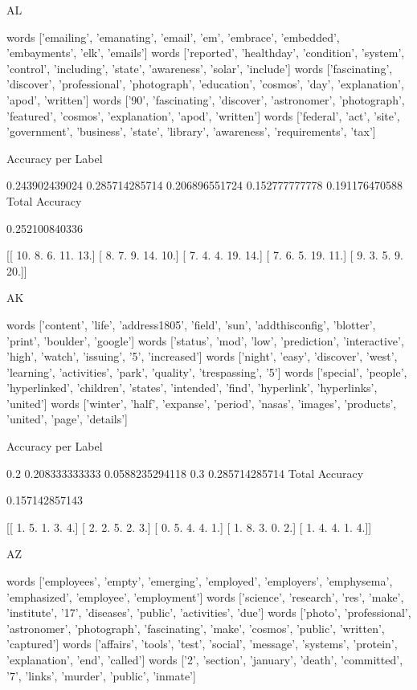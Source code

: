 \documentclass[11pt]{article}
\begin{document}
\begin{verbatium}
AL

words
['emailing', 'emanating', 'email', 'em', 'embrace', 'embedded', 'embayments', 'elk', 'emails']
words
['reported', 'healthday', 'condition', 'system', 'control', 'including', 'state', 'awareness', 'solar', 'include']
words
['fascinating', 'discover', 'professional', 'photograph', 'education', 'cosmos', 'day', 'explanation', 'apod', 'written']
words
['90', 'fascinating', 'discover', 'astronomer', 'photograph', 'featured', 'cosmos', 'explanation', 'apod', 'written']
words
['federal', 'act', 'site', 'government', 'business', 'state', 'library', 'awareness', 'requirements', 'tax']

Accuracy per Label

0.243902439024
0.285714285714
0.206896551724
0.152777777778
0.191176470588
Total Accuracy

0.252100840336


[[ 10.   8.   6.  11.  13.]
 [  8.   7.   9.  14.  10.]
 [  7.   4.   4.  19.  14.]
 [  7.   6.   5.  19.  11.]
 [  9.   3.   5.   9.  20.]]


AK


words
['content', 'life', 'address1805', 'field', 'sun', 'addthisconfig', 'blotter', 'print', 'boulder', 'google']
words
['status', 'mod', 'low', 'prediction', 'interactive', 'high', 'watch', 'issuing', '5', 'increased']
words
['night', 'easy', 'discover', 'west', 'learning', 'activities', 'park', 'quality', 'trespassing', '5']
words
['special', 'people', 'hyperlinked', 'children', 'states', 'intended', 'find', 'hyperlink', 'hyperlinks', 'united']
words
['winter', 'half', 'expanse', 'period', 'nasas', 'images', 'products', 'united', 'page', 'details']

Accuracy per Label

0.2
0.208333333333
0.0588235294118
0.3
0.285714285714
Total Accuracy

0.157142857143


[[ 1.  5.  1.  3.  4.]
 [ 2.  2.  5.  2.  3.]
 [ 0.  5.  4.  4.  1.]
 [ 1.  8.  3.  0.  2.]
 [ 1.  4.  4.  1.  4.]]


AZ


words
['employees', 'empty', 'emerging', 'employed', 'employers', 'emphysema', 'emphasized', 'employee', 'employment']
words
['science', 'research', 'res', 'make', 'institute', '17', 'diseases', 'public', 'activities', 'due']
words
['photo', 'professional', 'astronomer', 'photograph', 'fascinating', 'make', 'cosmos', 'public', 'written', 'captured']
words
['affairs', 'tools', 'test', 'social', 'message', 'systems', 'protein', 'explanation', 'end', 'called']
words
['2', 'section', 'january', 'death', 'committed', '7', 'links', 'murder', 'public', 'inmate']


\end{verbatium}
\end{document}
